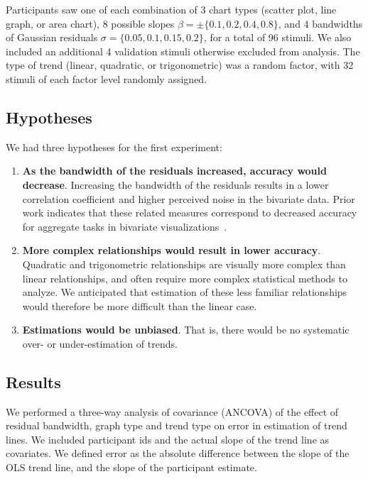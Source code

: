 \documentclass{sigchi}
\begin{document}
Participants saw one of each combination of 3 chart types (scatter plot, line graph, or area chart), 8 possible slopes $\beta = \pm \{0.1,0.2,0.4,0.8\}$, and 4 bandwidths of Gaussian residuals $\sigma = \{0.05,0.1,0.15,0.2\}$, for a total of 96 stimuli. We also included an additional 4 validation stimuli otherwise excluded from analysis. The type of trend (linear, quadratic, or trigonometric) was a random factor, with 32 stimuli of each factor level randomly assigned.

\subsection{Hypotheses}

We had three hypotheses for the first experiment:
\begin{enumerate}
	\item \textbf{As the bandwidth of the residuals increased, accuracy would decrease}. Increasing the bandwidth of the residuals results in a lower correlation coefficient and higher perceived noise in the bivariate data. Prior work indicates that these related measures correspond to decreased accuracy for aggregate tasks in bivariate visualizations~\cite{albers2014task, harrison2014ranking}.
	\item \textbf{More complex relationships would result in lower accuracy}. Quadratic and trigonometric relationships are visually more complex than linear relationships, and often require more complex statistical methods to analyze. We anticipated that estimation of these less familiar relationships would therefore be more difficult than the linear case.
	\item \textbf{Estimations would be unbiased}. That is, there would be no systematic over- or under-estimation of trends.
\end{enumerate}

\subsection{Results}

\expOnesigmasFig

\expOnetypesFig

We performed a three-way analysis of covariance (ANCOVA) of the effect of residual bandwidth, graph type and trend type on error in estimation of trend lines. We included participant ids and the actual slope of the trend line as covariates. We defined error as the absolute difference between the slope of the OLS trend line, and the slope of the participant estimate.
\end{document}
